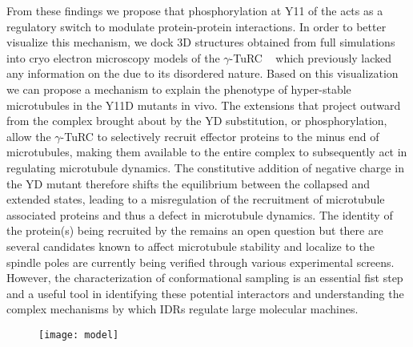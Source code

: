 \begin{figure}
\centering     %
{}
\label{fig:wells}
\end{figure}

From these findings we propose that phosphorylation at Y11 of the \gct acts as a regulatory switch to modulate protein-protein interactions. In order to better visualize this mechanism, we dock 3D structures obtained from full \tub simulations into cryo electron microscopy models of the $\gamma$-TuRC ~\cite{kollman2015ring}  which previously lacked any information on the \gct due to its disordered nature. Based on this visualization we can propose a mechanism to explain the phenotype of hyper-stable microtubules in the Y11D mutants in vivo. The extensions that project outward from the complex brought about by the YD substitution, or phosphorylation, allow the $\gamma$-TuRC to selectively recruit effector proteins to the minus end of microtubules, making them available to the entire complex to subsequently act in regulating microtubule dynamics. The constitutive addition of negative charge in the YD mutant therefore shifts the equilibrium between the collapsed and extended states, leading to a misregulation of the recruitment of microtubule associated proteins and thus a defect in microtubule dynamics. The identity of the  protein(s) being recruited by the \gct remains an open question but there are several candidates known to affect microtubule stability and localize to the spindle poles  are currently being verified through various experimental screens. However, the characterization of \gct conformational sampling  is an essential fist step and a useful tool in identifying these potential interactors and understanding the complex mechanisms by which IDRs regulate large molecular machines.

\begin{figure}
\centering
\texttt{[image: model]}
\label{fig:turc}
\end{figure}
